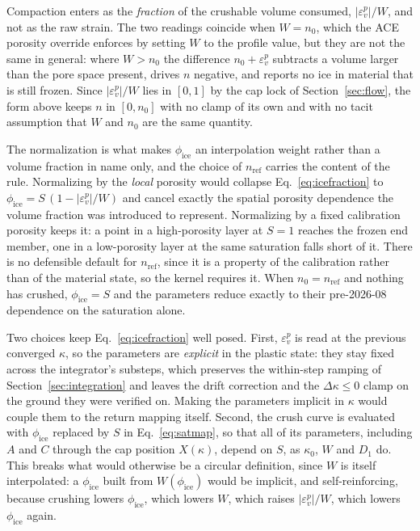 \documentclass[12pt]{article}
\begin{document}
Compaction enters as the \emph{fraction} of the crushable volume
consumed, $|\varepsilon_v^p| / W$, and not as the raw strain. The two
readings coincide when $W = n_0$, which the ACE porosity override
enforces by setting $W$ to the profile value, but they are not the
same in general: where $W > n_0$ the difference
$n_0 + \varepsilon_v^p$ subtracts a volume larger than the pore space
present, drives $n$ negative, and reports no ice in material that is
still frozen. Since $|\varepsilon_v^p| / W$ lies in $[0,1]$ by the cap
lock of Section~\ref{sec:flow}, the form above keeps $n$ in
$[0, n_0]$ with no clamp of its own and with no tacit assumption that
$W$ and $n_0$ are the same quantity.

The normalization is what makes $\phi_{\mathrm{ice}}$ an
interpolation weight rather than a volume fraction in name only, and
the choice of $n_{\mathrm{ref}}$ carries the content of the rule.
Normalizing by the \emph{local} porosity would collapse
Eq.~\eqref{eq:icefraction} to
$\phi_{\mathrm{ice}} = S\,(1 - |\varepsilon_v^p|/W)$ and cancel
exactly the spatial porosity dependence the volume fraction was
introduced to represent. Normalizing by a fixed calibration porosity
keeps it: a point in a high-porosity layer at $S = 1$ reaches the
frozen end member, one in a low-porosity layer at the same saturation
falls short of it. There is no defensible default for
$n_{\mathrm{ref}}$, since it is a property of the calibration rather
than of the material state, so the kernel requires it. When
$n_0 = n_{\mathrm{ref}}$ and nothing has crushed,
$\phi_{\mathrm{ice}} = S$ and the parameters reduce exactly to their
pre-2026-08 dependence on the saturation alone.

Two choices keep Eq.~\eqref{eq:icefraction} well posed. First,
$\varepsilon_v^p$ is read at the previous converged $\kappa$, so the
parameters are \emph{explicit} in the plastic state: they stay fixed
across the integrator's substeps, which preserves the within-step
ramping of Section~\ref{sec:integration} and leaves the drift
correction and the $\Delta\kappa \le 0$ clamp on the ground they were
verified on. Making the parameters implicit in $\kappa$ would couple
them to the return mapping itself. Second, the crush curve is
evaluated with $\phi_{\mathrm{ice}}$ replaced by $S$ in
Eq.~\eqref{eq:satmap}, so that all of its parameters, including $A$
and $C$ through the cap position $X(\kappa)$, depend on $S$, as
$\kappa_0$, $W$ and $D_1$ do. This breaks what would otherwise be a
circular definition, since
$W$ is itself interpolated: a $\phi_{\mathrm{ice}}$ built from
$W(\phi_{\mathrm{ice}})$ would be implicit, and self-reinforcing,
because crushing lowers $\phi_{\mathrm{ice}}$, which lowers $W$, which
raises $|\varepsilon_v^p|/W$, which lowers $\phi_{\mathrm{ice}}$
again.
\end{document}
